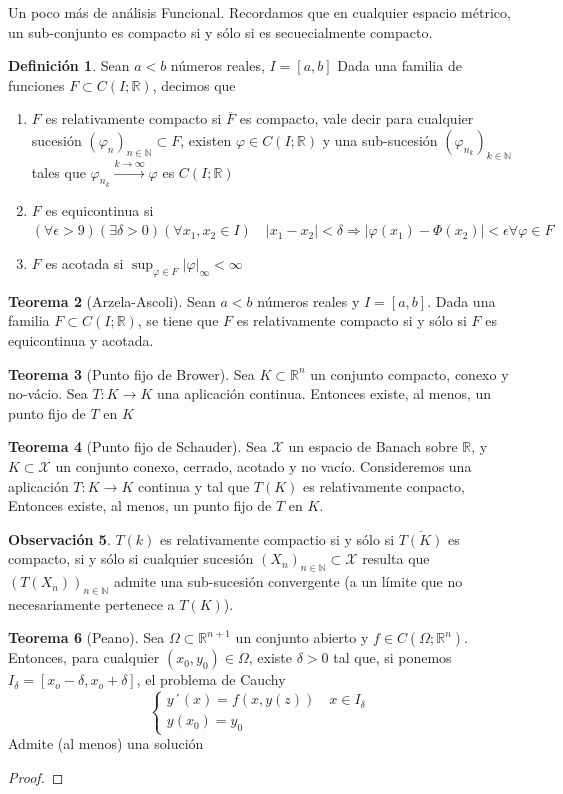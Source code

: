 \documentclass[11pt]{article}
\theoremstyle{definition} %
\newtheorem{theorem}{Teorema}[section]
\newtheorem{definition}[theorem]{Definición}
\newtheorem{remark}[theorem]{Observación}
\newcommand{\R}{\mathbb{R}}
\newcommand{\N}{\mathbb{N}}
\begin{document}
Un poco más de análisis Funcional.
Recordamos que en cualquier espacio métrico, un sub-conjunto es compacto si y sólo si es secuecialmente compacto.

\begin{definition}
  Sean $a<b$ números reales, $I=[a,b]$ Dada una familia de funciones $  F\subset C(I;\R)$, decimos que
  \begin{enumerate}
    \item $F$ es relativamente compacto si $\overline{F}$ es compacto, vale decir para cualquier sucesión $(\varphi_n)_{n\in \N} \subset F$, existen $\varphi \in C(I;\R)$ y una sub-sucesión $(\varphi_{n}_k)_{k\in \N}$ tales que $\varphi_{n}_k \xrightarrow{k\to \infty}\varphi$ es $C(I;\R)$
    \item $F$ es equicontinua si $(\forall \epsilon >9)(\exists \delta > 0)(\forall x_1,x_2 \in I) \quad |x_1-x_2|<\delta \Rightarrow |\varphi(x_1)-\Phi(x_2)|<\epsilon \forall \varphi \in F$ 
    \item $F$ es acotada si $\sup_{\varphi \in F}|\varphi|_{\infty} < \infty $ 
  \end{enumerate}
\end{definition}

\begin{theorem}[Arzela-Ascoli] 
  Sean $a<b$ números reales y $I=[a,b]$. Dada una familia $F\subset C(I;\R)$, se tiene que $F$ es relativamente compacto si y sólo si $F$ es equicontinua y acotada.
\end{theorem}

\begin{theorem}[Punto fijo de Brower] 
  Sea $K\subset \R^n$ un conjunto compacto, conexo y no-vácio. Sea $T:K\rightarrow K$ una aplicación continua. Entonces existe, al menos, un punto fijo de $T$ en $K$
\end{theorem}

\begin{theorem}[Punto fijo de Schauder]
  Sea $\mathcal{X}$ un espacio de Banach sobre $\R$, y $K\subset \mathcal{X}$ un conjunto conexo, cerrado, acotado y no vacío. Consideremos una aplicación $T:K\rightarrow K$  continua y tal que $T(K)$ es relativamente conpacto, Entonces existe, al menos, un punto fijo de $T$ en $K$.
\end{theorem}

\begin{remark}
  $T(k)$ es relativamente compactio si y sólo si $\overline{T(K)}$ es compacto, si y sólo si cualquier sucesión $(X_n)_{n\in \N}\subset \mathcal{X}$ resulta que $(T(X_n))_{n\in \N}$ admite una sub-sucesión convergente (a un límite que no necesariamente pertenece a $T(K)$).
\end{remark}
\begin{theorem}[Peano] Sea $\Omega \subset \R^{n+1}$ un conjunto abierto y $f \in C(\Omega;\R^n)$. Entonces, para cualquier $(x_0,y_0)\in \Omega$, existe $\delta>0$ tal que, si ponemos $I_{\delta}=[x_o-\delta,x_o+\delta]$, el problema de Cauchy
  \[
    \begin{cases}
      y´(x)=f(x,y(z)) \quad x \in I_{\delta} \\ y(x_0)=y_0
    \end{cases}
  \]
  Admite (al menos) una solución
\end{theorem}

\begin{proof}

\end{proof}
\end{document}
